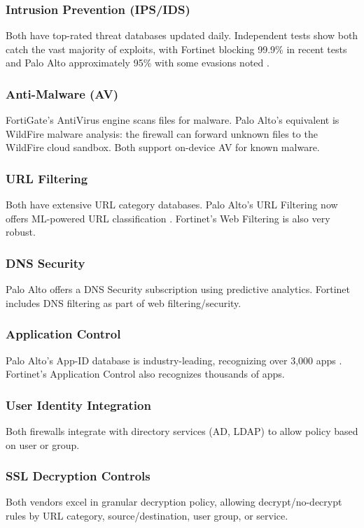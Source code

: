 \documentclass[12pt]{article}
\begin{document}
\subsubsection{Intrusion Prevention (IPS/IDS)}
Both have top-rated threat databases updated daily. Independent tests show both catch the vast majority of exploits, with Fortinet blocking 99.9\% in recent tests and Palo Alto approximately 95\% with some evasions noted \cite{cyberratings2023} \cite{cyberratings2023exclusivenetworks}.

\subsubsection{Anti-Malware (AV)}
FortiGate's AntiVirus engine scans files for malware. Palo Alto's equivalent is WildFire malware analysis: the firewall can forward unknown files to the WildFire cloud sandbox. Both support on-device AV for known malware.

\subsubsection{URL Filtering}
Both have extensive URL category databases. Palo Alto's URL Filtering now offers ML-powered URL classification \cite{paloaltourl2024}. Fortinet's Web Filtering is also very robust.

\subsubsection{DNS Security}
Palo Alto offers a DNS Security subscription using predictive analytics. Fortinet includes DNS filtering as part of web filtering/security.

\subsubsection{Application Control}
Palo Alto's App-ID database is industry-leading, recognizing over 3,000 apps \cite{pa3400datasheet} \cite{paloaltoappid2024}. Fortinet's Application Control also recognizes thousands of apps.

\subsubsection{User Identity Integration}
Both firewalls integrate with directory services (AD, LDAP) to allow policy based on user or group.

\subsubsection{SSL Decryption Controls}
Both vendors excel in granular decryption policy, allowing decrypt/no-decrypt rules by URL category, source/destination, user group, or service.
\end{document}
